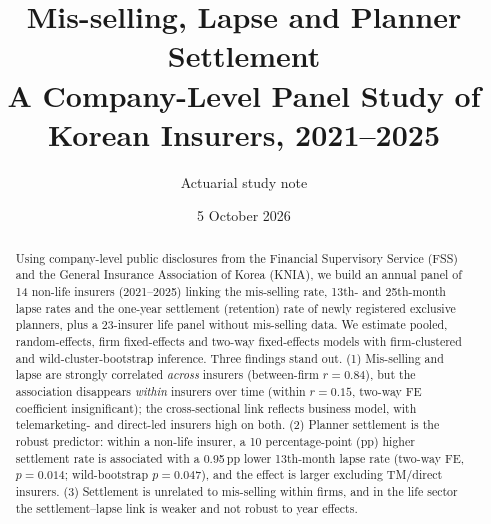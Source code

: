 \documentclass[11pt,a4paper]{article}
\title{\textbf{Mis-selling, Lapse and Planner Settlement}\\[4pt]
\large A Company-Level Panel Study of Korean Insurers, 2021--2025}
\author{Actuarial study note}
\date{5 October 2026}
\begin{document}
\maketitle

\begin{abstract}
\noindent Using company-level public disclosures from the Financial Supervisory Service (FSS) and the General
Insurance Association of Korea (KNIA), we build an annual panel of 14 non-life insurers (2021--2025) linking
the mis-selling rate, 13th- and 25th-month lapse rates and the one-year settlement (retention) rate of newly
registered exclusive planners, plus a 23-insurer life panel without mis-selling data. We estimate pooled, random-effects,
firm fixed-effects and two-way fixed-effects models with firm-clustered and wild-cluster-bootstrap inference.
Three findings stand out. (1) Mis-selling and lapse are strongly correlated \emph{across} insurers
(between-firm $r=0.84$), but the association disappears \emph{within} insurers over time (within $r=0.15$,
two-way FE coefficient insignificant); the cross-sectional link reflects business model, with
telemarketing- and direct-led insurers high on both. (2) Planner settlement is the robust predictor: within a
non-life insurer, a 10 percentage-point (pp) higher settlement rate is associated with a 0.95\,pp lower
13th-month lapse rate (two-way FE, $p=0.014$; wild-bootstrap $p=0.047$), and the effect is larger excluding
TM/direct insurers. (3) Settlement is unrelated to mis-selling within firms, and in the life sector the
settlement--lapse link is weaker and not robust to year effects.
\end{abstract}

\tableofcontents

\end{document}
